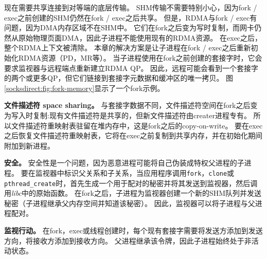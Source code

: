 现在需要共享连接到对等端的底层传输。
SHM传输不需要特别小心，因为fork / exec之前创建的SHM仍然在fork / exec之后共享。
但是，RDMA与fork / exec有问题，因为DMA内存区域不在SHM中。
它们在fork之后变为写时复制，而网卡仍然从原始物理页面DMA，因此子进程不能使用现有的RDMA资源。
在exec之后，整个RDMA上下文被清除。
本章的解决方案是让子进程在fork / exec之后重新初始化RDMA资源（PD，MR等）。
当子进程使用在fork之前创建的套接字时，它会要求监视器与远程端点重新建立RDMA QP。
因此，远程可能会看到一个套接字的两个或更多QP，但它们链接到套接字元数据和缓冲区的唯一拷贝。
图 \ref {socksdirect:fig:fork-memory}显示了一个fork示例。

\textbf {文件描述符 space sharing。}
与套接字数据不同，文件描述符空间在fork之后变为写入时复制:现有文件描述符是共享的，但新文件描述符由creater进程专有。
所以文件描述符重映射表驻留在堆内存中，这是fork之后的copy-on-write。
要在exec之后恢复文件描述符重映射表，它将在exec之前复制到共享内存，并在\libipc {}初始化期间附加到新进程。

\textbf{安全。}
安全性是一个问题，因为恶意进程可能将自己伪装成特权父进程的子进程。
要在监视器中标识父关系和子关系，当应用程序调用\texttt {fork}，\texttt {clone}或\texttt {pthread\_create}时，\libipc {}首先生成一个用于配对的秘密并将其发送到监视器，然后调用\emph {libc}中的原始函数。
在fork之后，子进程为监视器创建一个新的SHM队列并发送秘密（子进程继承父内存空间并知道该秘密）。
因此，监视器可以将子进程与父进程配对。

\textbf {监视行动。}
在fork，exec或线程创建时，每个现有套接字需要将发送方添加到发送方向，将接收方添加到接收方向。
父进程继承该令牌，因此子进程始终处于非活动状态。



